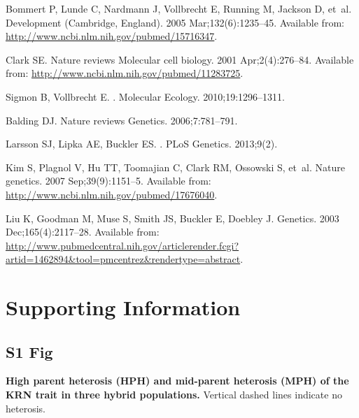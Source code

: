 \documentclass[10pt,letterpaper]{article}
\begin{document}
\begin{thebibliography}{10}
Bommert P, Lunde C, Nardmann J, Vollbrecht E, Running M, Jackson D, et~al.
\newblock Development (Cambridge, England). 2005 Mar;132(6):1235--45.
\newblock Available from: \url{http://www.ncbi.nlm.nih.gov/pubmed/15716347}.

Clark SE.
\newblock Nature reviews Molecular cell biology. 2001 Apr;2(4):276--84.
\newblock Available from: \url{http://www.ncbi.nlm.nih.gov/pubmed/11283725}.

Sigmon B, Vollbrecht E.
.
\newblock Molecular Ecology. 2010;19:1296--1311.

Balding DJ.
\newblock Nature reviews Genetics. 2006;7:781--791.

Larsson SJ, Lipka AE, Buckler ES.
.
\newblock PLoS Genetics. 2013;9(2).

Kim S, Plagnol V, Hu TT, Toomajian C, Clark RM, Ossowski S, et~al.
\newblock Nature genetics. 2007 Sep;39(9):1151--5.
\newblock Available from: \url{http://www.ncbi.nlm.nih.gov/pubmed/17676040}.

Liu K, Goodman M, Muse S, Smith JS, Buckler E, Doebley J.
\newblock Genetics. 2003 Dec;165(4):2117--28.
\newblock Available from:
  \url{http://www.pubmedcentral.nih.gov/articlerender.fcgi?artid=1462894\&tool=pmcentrez\&rendertype=abstract}.

\end{thebibliography}

\section*{Supporting Information}


\subsection*{S1 Fig}
\label{Fig_S1}
{\bf High parent heterosis (HPH) and mid-parent heterosis (MPH) of the KRN trait in three hybrid populations.} Vertical dashed lines indicate no heterosis.
\end{document}
